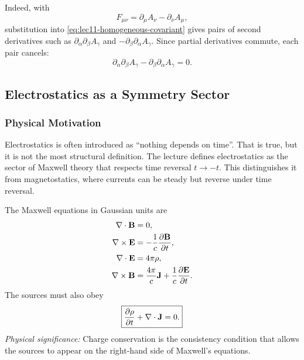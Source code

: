 Indeed, with
\begin{equation}\label{eq:lec11-F-from-A}
  F_{\mu\nu}=\partial_\mu A_\nu-\partial_\nu A_\mu,
\end{equation}
substitution into \eqref{eq:lec11-homogeneous-covariant} gives pairs of second
derivatives such as $\partial_\alpha\partial_\beta A_\gamma$ and
$-\partial_\beta\partial_\alpha A_\gamma$.  Since partial derivatives commute,
each pair cancels:
\begin{equation}\label{eq:lec11-second-derivative-cancel}
  \partial_\alpha\partial_\beta A_\gamma
  -
  \partial_\beta\partial_\alpha A_\gamma
  =
  0 .
\end{equation}

\subsection{Electrostatics as a Symmetry Sector}\label{subsec:lec11-electrostatics}

\subsubsection*{Physical Motivation}
Electrostatics is often introduced as ``nothing depends on time''.  That is true,
but it is not the most structural definition.  The lecture defines electrostatics
as the sector of Maxwell theory that respects time reversal $t\to -t$.  This
distinguishes it from magnetostatics, where currents can be steady but reverse
under time reversal.

The Maxwell equations in Gaussian units are
\begin{align}
  \nabla\cdot\mathbf{B} &= 0, \label{eq:lec11-maxwell-divB}\\
  \nabla\times\mathbf{E} &= -\frac{1}{c}\pdv{\mathbf{B}}{t}, \label{eq:lec11-maxwell-faraday}\\
  \nabla\cdot\mathbf{E} &= 4\pi\rho, \label{eq:lec11-maxwell-gauss}\\
  \nabla\times\mathbf{B} &= \frac{4\pi}{c}\mathbf{J}+\frac{1}{c}\pdv{\mathbf{E}}{t}. \label{eq:lec11-maxwell-ampere}
\end{align}
The sources must also obey
\begin{equation}\label{eq:lec11-continuity}
  \boxed{
  \pdv{\rho}{t}+\nabla\cdot\mathbf{J}=0 .
  }
\end{equation}
\textit{Physical significance:} Charge conservation is the consistency condition
that allows the sources to appear on the right-hand side of Maxwell's equations.

